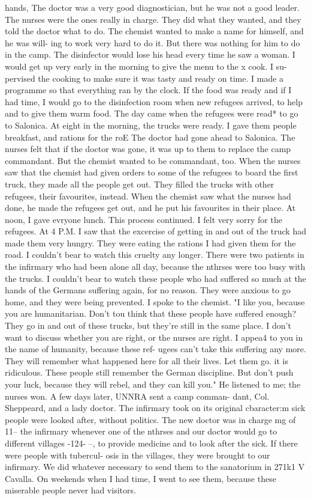 hands, The doctor was a very good diagnostician, but he was not a good leader.
The nurses were the ones really in charge.
They did what they wanted, and they told 
the doctor what to do.
The chemist wanted to make a name for himself, and he was will-
ing to work very hard to do it.
But there was nothing for him to do in the camp.
The 
disinfector would lose his head every time he saw a woman.
I would get up very early in the morning to give the menu to the x cook.
I su-
pervised the cooking to make sure it was tasty and ready on time.
I made a programme 
so that everything ran by the clock.
If the food was ready and if I had time, I would 
go to the disinfection room when new refugees arrived, to help and to give them warm 
food.
The day came when the refugees were read* to go to Salonica.
At eight in the 
morning, the trucks were ready.
I gave them people breakfast, and rations for the roE 
The doctor had gone ahead to Salonica.
The nurses felt that if the doctor was gone, 
it was up to them to replace the camp commandant.
But the chemist wanted to be 
commandant, too.
When the nurses saw that the chemist had given orders to some of 
the refugees to board the first truck, they made all the people get out.
They filled 
the trucks with other refugees, their favourites, instead.
When the chemist saw 
what the nurses had done, he made the refugees get out, and he put his favourites in 
their place.
At noon, I gave evryone lunch.
This process continued.
I felt very sorry for the refugees.
At 4 P.M.
I saw 
that the excercise of getting in and out of the truck had made them very hungry.
They were eating the rations I had given them for the road.
I couldn't bear to watch 
this cruelty any longer.
There were two patients in the infirmary who had been alone 
all day, because the nthrses were too busy with the trucks.
I couldn't bear to watch 
these people who had suffered so much at the hands of the Germans suffering again, 
for no reason.
They were anxious to go home, and they were being prevented.
I spoke to the chemist.
"I like you, because you are humanitarian.
Don't tou 
think that these people have suffered enough?
They go in and out of these trucks, 
but they're still in the same place.
I don't want to discuss whether you are right, 
or the nurses are right.
I appea4 to you in the name of humanity, because these ref-
ugees can't take this suffering any more.
They will remember what happened here for 
all their lives.
Let them go.
it is ridiculous.
These people still remember the 
German discipline.
But don't push your luck, because they will rebel, and they can 
kill you."
He listened to me; the nurses won.
A few days later, UNNRA sent a camp comman-
dant, Col.
Sheppeard, and a lady doctor.
The infirmary took on its original cbaracter:m 
sick people were looked after, without politics.
The new doctor was in charge mg of 11-- 
the infirmary whenever one of the nthrses and our doctor would go to different villages 
-124- 
--, to provide medicine and to look after the sick.
If there were people with tubercul-
osis in the villages, they were brought to our infirmary.
We did whatever necessary 
to send them to the sanatorium in 271k1 V Cavalla.
On weekends when I had time, I 
went to see them, because these miserable people never had visitors.